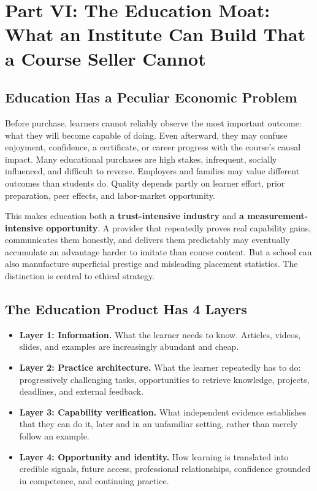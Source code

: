 \section*{Part VI: The Education Moat: What an Institute Can Build That a Course Seller Cannot}
\label{sec:part6_the_education_moat}

\subsection{Education Has a Peculiar Economic Problem}
\label{sec:education_peculiar_economic_problem}

Before purchase, learners cannot reliably observe the most important outcome: what they will become capable of doing. Even afterward, they may confuse enjoyment, confidence, a certificate, or career progress with the course's causal impact. Many educational purchases are high stakes, infrequent, socially influenced, and difficult to reverse. Employers and families may value different outcomes than students do. Quality depends partly on learner effort, prior preparation, peer effects, and labor-market opportunity.

This makes education both \textbf{a trust-intensive industry} and \textbf{a measurement-intensive opportunity}. A provider that repeatedly proves real capability gains, communicates them honestly, and delivers them predictably may eventually accumulate an advantage harder to imitate than course content. But a school can also manufacture superficial prestige and misleading placement statistics. The distinction is central to ethical strategy.

\subsection{The Education Product Has 4 Layers}
\label{sec:education_product_four_layers}

\begin{itemize}
    \item \textbf{Layer 1: Information.} What the learner needs to know. Articles, videos, slides, and examples are increasingly abundant and cheap.
    \item \textbf{Layer 2: Practice architecture.} What the learner repeatedly has to do: progressively challenging tasks, opportunities to retrieve knowledge, projects, deadlines, and external feedback.
    \item \textbf{Layer 3: Capability verification.} What independent evidence establishes that they can do it, later and in an unfamiliar setting, rather than merely follow an example.
    \item \textbf{Layer 4: Opportunity and identity.} How learning is translated into credible signals, future access, professional relationships, confidence grounded in competence, and continuing practice.
\end{itemize}

